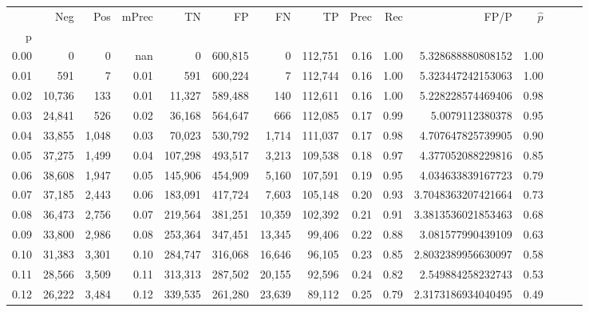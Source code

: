 \begin{tabular}{rrrrrrrrrrrrrrr}
\toprule
{} &     Neg &    Pos & mPrec &       TN &       FP &       FN &       TP &  Prec &   Rec &                    FP/P & $\hat{p}$ \\
p    &         &        &       &          &          &          &          &       &       &                         &           \\
\midrule
0.00 &       0 &      0 &   nan &        0 &  600,815 &        0 &  112,751 &  0.16 &  1.00 &       5.328688880808152 &      1.00 \\
0.01 &     591 &      7 &  0.01 &      591 &  600,224 &        7 &  112,744 &  0.16 &  1.00 &       5.323447242153063 &      1.00 \\
0.02 &  10,736 &    133 &  0.01 &   11,327 &  589,488 &      140 &  112,611 &  0.16 &  1.00 &       5.228228574469406 &      0.98 \\
0.03 &  24,841 &    526 &  0.02 &   36,168 &  564,647 &      666 &  112,085 &  0.17 &  0.99 &         5.0079112380378 &      0.95 \\
0.04 &  33,855 &  1,048 &  0.03 &   70,023 &  530,792 &    1,714 &  111,037 &  0.17 &  0.98 &       4.707647825739905 &      0.90 \\
0.05 &  37,275 &  1,499 &  0.04 &  107,298 &  493,517 &    3,213 &  109,538 &  0.18 &  0.97 &       4.377052088229816 &      0.85 \\
0.06 &  38,608 &  1,947 &  0.05 &  145,906 &  454,909 &    5,160 &  107,591 &  0.19 &  0.95 &       4.034633839167723 &      0.79 \\
0.07 &  37,185 &  2,443 &  0.06 &  183,091 &  417,724 &    7,603 &  105,148 &  0.20 &  0.93 &      3.7048363207421664 &      0.73 \\
0.08 &  36,473 &  2,756 &  0.07 &  219,564 &  381,251 &   10,359 &  102,392 &  0.21 &  0.91 &      3.3813536021853463 &      0.68 \\
0.09 &  33,800 &  2,986 &  0.08 &  253,364 &  347,451 &   13,345 &   99,406 &  0.22 &  0.88 &       3.081577990439109 &      0.63 \\
0.10 &  31,383 &  3,301 &  0.10 &  284,747 &  316,068 &   16,646 &   96,105 &  0.23 &  0.85 &      2.8032389956630097 &      0.58 \\
0.11 &  28,566 &  3,509 &  0.11 &  313,313 &  287,502 &   20,155 &   92,596 &  0.24 &  0.82 &       2.549884258232743 &      0.53 \\
0.12 &  26,222 &  3,484 &  0.12 &  339,535 &  261,280 &   23,639 &   89,112 &  0.25 &  0.79 &      2.3173186934040495 &      0.49 \\

\end{tabular}
